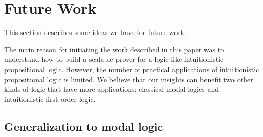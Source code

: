 \documentclass{llncs}
\begin{document}





\section{Future Work}

This section describes some ideas we have for future work.

The main reason for initiating the work described in this paper was to understand how to build a scalable prover for a logic like intuitionistic propositional logic. However, the number of practical applications of intuitionistic propositional logic is limited. We believe that our insights can benefit two other kinds of logic that have more applications: classical modal logics and intuitionistic first-order logic.

\subsection{Generalization to modal logic}
\end{document}
